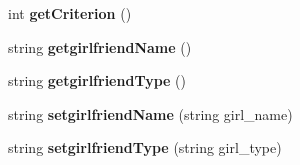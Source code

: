 \begin{DoxyCompactItemize}
\item 
int {\bfseries get\+Criterion} ()\hypertarget{class_boy_a90c3827de3dda063f79fbe8bd3f33ba2}{}\label{class_boy_a90c3827de3dda063f79fbe8bd3f33ba2}

\item 
string {\bfseries getgirlfriend\+Name} ()\hypertarget{class_boy_a808045d7bdec1df62e4b3b00960b81bb}{}\label{class_boy_a808045d7bdec1df62e4b3b00960b81bb}

\item 
string {\bfseries getgirlfriend\+Type} ()\hypertarget{class_boy_a666ae675bf906e6a5416de8c2db2a3e4}{}\label{class_boy_a666ae675bf906e6a5416de8c2db2a3e4}

\item 
string {\bfseries setgirlfriend\+Name} (string girl\+\_\+name)\hypertarget{class_boy_ae13293b506d5b560382bb9dcdee81923}{}\label{class_boy_ae13293b506d5b560382bb9dcdee81923}

\item 
string {\bfseries setgirlfriend\+Type} (string girl\+\_\+type)\hypertarget{class_boy_a9f0c240246c32818a4d37ec5502f087c}{}\label{class_boy_a9f0c240246c32818a4d37ec5502f087c}

\end{DoxyCompactItemize}
